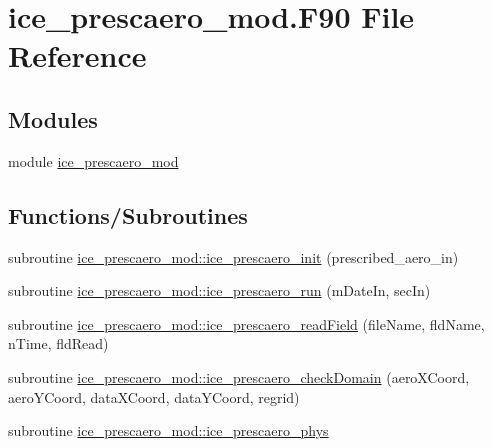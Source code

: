 \hypertarget{ice__prescaero__mod_8F90}{
\section{ice\_\-prescaero\_\-mod.F90 File Reference}
\label{ice__prescaero__mod_8F90}
}
\subsection*{Modules}
\begin{DoxyCompactItemize}
\item 
module \hyperlink{namespaceice__prescaero__mod}{ice\_\-prescaero\_\-mod}
\end{DoxyCompactItemize}
\subsection*{Functions/Subroutines}
\begin{DoxyCompactItemize}
\item 
subroutine \hyperlink{namespaceice__prescaero__mod_a49687e63d926d56d80c47d29f3348bf3}{ice\_\-prescaero\_\-mod::ice\_\-prescaero\_\-init} (prescribed\_\-aero\_\-in)
\item 
subroutine \hyperlink{namespaceice__prescaero__mod_a26d851ac89ccf10b178b800a3c9a3c68}{ice\_\-prescaero\_\-mod::ice\_\-prescaero\_\-run} (mDateIn, secIn)
\item 
subroutine \hyperlink{namespaceice__prescaero__mod_a0abb4e2f6271ccd9b7df6b797d3f6b4e}{ice\_\-prescaero\_\-mod::ice\_\-prescaero\_\-readField} (fileName, fldName, nTime, fldRead)
\item 
subroutine \hyperlink{namespaceice__prescaero__mod_a047baf1e9b916248581b645f065f84d7}{ice\_\-prescaero\_\-mod::ice\_\-prescaero\_\-checkDomain} (aeroXCoord, aeroYCoord, dataXCoord, dataYCoord, regrid)
\item 
subroutine \hyperlink{namespaceice__prescaero__mod_a255b193e694ed5ffbbad1b5c3935173b}{ice\_\-prescaero\_\-mod::ice\_\-prescaero\_\-phys}
\end{DoxyCompactItemize}
